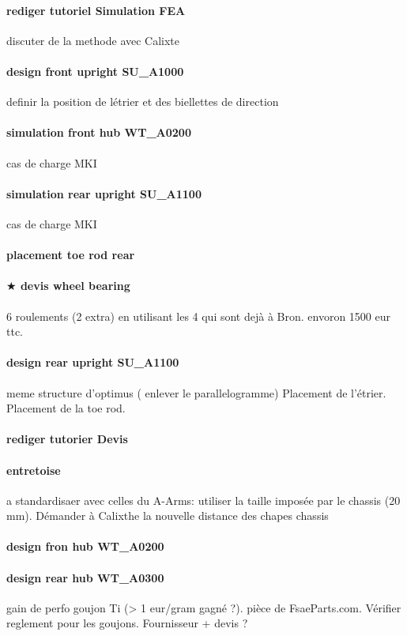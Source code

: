 \paragraph{rediger tutoriel Simulation FEA} discuter de la methode avec Calixte
\paragraph{design front upright SU\_A1000} definir la position de létrier et des biellettes de direction 
\paragraph{simulation front hub WT\_A0200} cas de charge MKI

\paragraph{simulation rear upright SU\_A1100} cas de charge MKI
\paragraph{placement toe rod rear} 
\paragraph{$\bigstar$ devis wheel bearing}  6 roulements (2 extra) en utilisant les 4 qui sont dejà à Bron. envoron 1500 eur ttc. 
\paragraph{design rear upright SU\_A1100} meme structure d'optimus ( enlever le parallelogramme) Placement de l'étrier. Placement de la toe rod.

\paragraph{rediger tutorier Devis} 
\paragraph{entretoise}  a standardisaer avec celles du A-Arms: utiliser la taille imposée par le chassis (20 mm). Démander à Calixthe la nouvelle distance des chapes chassis 
\paragraph{design fron hub WT\_A0200} 
\paragraph{design rear hub WT\_A0300} gain de perfo goujon Ti (> 1 eur/gram gagné ?). pièce de FsaeParts.com. Vérifier reglement pour les goujons. Fournisseur + devis ?
